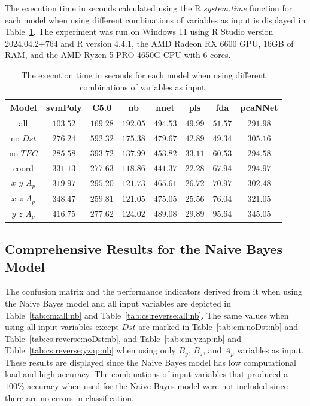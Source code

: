 \documentclass[sn-mathphys-num]{sn-jnl}%
\begin{document}
The execution time in seconds calculated using the R \textit{system.time} function \cite{rdocumentationSystemtimeFunction} for each model when using different combinations of variables as input is displayed in Table~\ref{tab:time:total}. The experiment was run on Windows 11 using R Studio version 2024.04.2+764 and R version 4.4.1, the AMD Radeon RX 6600 GPU, 16GB of RAM, and the AMD Ryzen 5 PRO 4650G CPU with 6 cores.

\begin{table}[!ht]
    \centering
    \caption{The execution time in seconds for each model when using different combinations of variables as input.}
	\label{tab:time:total}
	\begin{tabular}{|c|c|c|c|c|c|c|c|}
		\hline
		Model & svmPoly & C5.0 & nb & nnet & pls & fda & pcaNNet \\ \hline
		all & $103.52$ & $169.28$ & $192.05$ & $494.53$ & $49.99$ & $51.57$ & $291.98$ \\ \hline
		no $Dst$ & $276.24$ & $592.32$ & $175.38$ & $479.67$ & $42.89$ & $49.34$ & $305.16$ \\ \hline
		no $TEC$ & $285.58$ & $393.72$ & $137.99$ & $453.82$ & $33.11$ & $60.53$ & $294.58$ \\ \hline
		coord & $331.13$ & $277.63$ & $118.86$ & $441.37$ & $22.28$ & $67.94$ & $294.97$ \\ \hline
		$x$ $y$ $A_{p}$ & $319.97$ & $295.20$ & $121.73$ & $465.61$ & $26.72$ & $70.97$ & $302.48$ \\ \hline
		$x$ $z$ $A_{p}$ & $348.47$ & $259.81$ & $121.05$ & $475.05$ & $25.56$ & $76.04$ & $321.05$ \\ \hline
		$y$ $z$ $A_{p}$ & $416.75$ & $277.62$ & $124.02$ & $489.08$ & $29.89$ & $95.64$ & $345.05$ \\ \hline
	\end{tabular}
\end{table}

\subsection{Comprehensive Results for the Naive Bayes Model}

The confusion matrix and the performance indicators derived from it when using the Naive Bayes model and all input variables are depicted in Table~\ref{tab:cm:all:nb} and Table~\ref{tab:cs:reverse:all:nb}. The same values when using all input variables except $Dst$ are marked in Table~\ref{tab:cm:noDst:nb} and Table~\ref{tab:cs:reverse:noDst:nb}, and Table~\ref{tab:cm:yzap:nb} and Table~\ref{tab:cs:reverse:yzap:nb} when using only $B_{y}$, $B_{z}$, and $A_{p}$ variables as input. These results are displayed since the Naive Bayes model has low computational load and high accuracy. The combinations of input variables that produced a $100\%$ accuracy when used for the Naive Bayes model were not included since there are no errors in classification.
\end{document}

